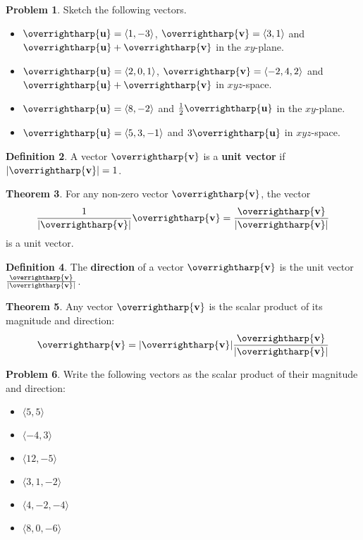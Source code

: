 \documentclass[letterpaper, twoside, 12pt]{book}
\newcommand{\<}{\langle}
\renewcommand{\>}{\rangle}
\theoremstyle{definition}
\newtheorem{theorem}{Theorem}
\theoremstyle{definition}
\newtheorem{definition}[theorem]{Definition}
\newtheorem{problem}[theorem]{Problem}
\newcommand{\harpvec}[1]{\overrightharp{\ensuremath{\mathbf{#1}}}}
\begin{document}
\newpage

\begin{problem}
  Sketch the following vectors.
  \begin{itemize}
    \item $\harpvec{u}=\<1,-3\>$, $\harpvec{v}=\<3,1\>$
          and $\harpvec{u}+\harpvec{v}$ in the $xy$-plane.
    \item $\harpvec{u}=\<2,0,1\>$, $\harpvec{v}=\<-2,4,2\>$
          and $\harpvec{u}+\harpvec{v}$ in $xyz$-space.
    \item $\harpvec{u}=\<8,-2\>$ and $\frac{1}{2}\harpvec{u}$ in the $xy$-plane.
    \item $\harpvec{u}=\<5,3,-1\>$ and $3\harpvec{u}$ in $xyz$-space.
  \end{itemize}
\end{problem}

\vfill

\begin{definition}
  A vector $\harpvec{v}$ is a \textbf{unit vector} if $|\harpvec v|=1$.
\end{definition}

\begin{theorem}
  For any non-zero vector $\harpvec{v}$, the vector
  \[
    \frac{1}{|\harpvec v|}\harpvec{v} = \frac{\harpvec v}{|\harpvec v|}
  \]
  is a unit vector.
\end{theorem}

\begin{definition}
  The \textbf{direction} of a vector $\harpvec v$ is the unit vector
  $\frac{\harpvec v}{|\harpvec v|}$.
\end{definition}

\begin{theorem}
  Any vector $\harpvec v$ is the scalar product of its magnitude and direction:
  \[
    \harpvec v = |\harpvec v|\frac{\harpvec v}{|\harpvec v|}
  \]
\end{theorem}

\newpage

\begin{problem}
  Write the following vectors as the scalar product of their magnitude and
  direction:
  \begin{itemize}
    \item $\<5,5\>$
    \item $\<-4,3\>$
    \item $\<12,-5\>$
    \item $\<3,1,-2\>$
    \item $\<4,-2,-4\>$
    \item $\<8,0,-6\>$
  \end{itemize}
\end{problem}
\end{document}

